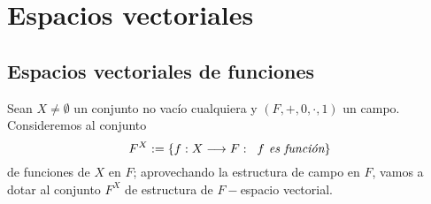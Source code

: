 \chapter{Espacios vectoriales}

\section{Espacios vectoriales de funciones}
\label{subsection: espacios vect de funciones}

Sean $X \neq \emptyset$ un conjunto no vacío cualquiera
y $(F, +, 0, \cdot, 1)$ un campo. Consideremos al conjunto
\[
F^{X} := \{ f: X \longrightarrow F :
\hspace{0.2cm} f \textit{ es función} \} 
\]
de funciones de $X$ en $F$; aprovechando la estructura de campo
en $F$, vamos a dotar al conjunto $F^{X}$ de estructura
de $F-$espacio vectorial.\\


